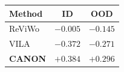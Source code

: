 \documentclass[border=8pt]{standalone}
\begin{document}
\begin{tabular}{lcc}
  \toprule
  \textbf{Method} & \textbf{ID} & \textbf{OOD} \\
  \midrule
  ReViWo & $-0.005$ & $-0.145$ \\
  VILA   & $-0.372$ & $-0.271$ \\
  \rowcolor{canonblue}\textbf{CANON} & $\mathbf{+0.384}$ & $\mathbf{+0.296}$ \\
  \bottomrule
\end{tabular}
\end{document}

